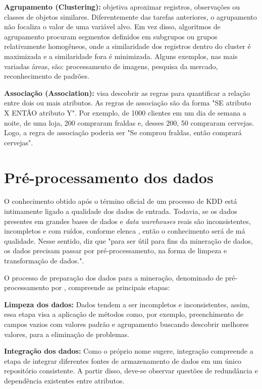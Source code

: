 \documentclass[projtg]{mdtufsm}
\begin{document}
\textbf{Agrupamento (Clustering):} objetiva aproximar registros, observações ou classes de objetos similares. Diferentemente das tarefas anteriores, o agrupamento não focaliza o valor de uma variável alvo. Em vez disso, algoritmos de agrupamento procuram segmentos definidos em subgrupos ou grupos relativamente homogêneos, onde a similaridade dos registros dentro do cluster é maximizada e a similaridade fora é minimizada. Alguns exemplos, nas mais variadas áreas, são: processamento de imagens, pesquisa da mercado, reconhecimento de padrões. 

\textbf{Associação (Association):} visa descobrir as regras para quantificar a relação entre dois ou mais atributos. As regras de associação são da forma "SE atributo X ENTÃO atributo Y". Por exemplo, de 1000 clientes em um dia de semana a noite, de uma loja, 200 compraram fraldas e, desses 200, 50 compraram cervejas. Logo, a regra de associação poderia ser "Se comprou fraldas, então comprará cervejas".


\section{Pré-processamento dos dados}

O conhecimento obtido após o término oficial de um processo de KDD está intimamente ligado a qualidade dos dados de entrada. Todavia, se os dados presentes em grandes bases de dados e \textit{data warehouses} reais são inconsistentes, incompletos e com ruídos, conforme elenca \cite{Han-kamber2nd}, então o conhecimento será de má qualidade. Nesse sentido, \cite{larose2005} diz que "para ser útil para fins da mineração de dados, os dados precisam passar por pré-processamento, na forma de limpeza e transformação de dados.".

O processo de preparação dos dados para a mineração, denominado de pré-processamento por \cite{Han-kamber2nd}, compreende as principais etapas:

\textbf{Limpeza dos dados:} Dados tendem a ser incompletos e inconsistentes, assim, essa etapa visa a aplicação de métodos como, por exemplo, preenchimento de campos vazios com valores padrão e agrupamento buscando descobrir melhores valores, para a eliminação de problemas. 

\textbf{Integração dos dados:} Como o próprio nome sugere, integração compreende a etapa de integrar diferentes fontes de armazenamento de dados em um único repositório consistente. A partir disso, deve-se observar questões de redundância e dependência existentes entre atributos.
\end{document}
